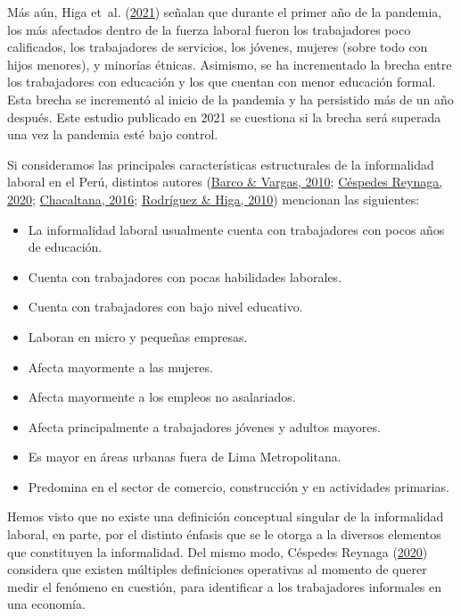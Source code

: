 \documentclass[
  letterpaper,
  12pt,
  oneside,
  spanish,
  doublespacing,
  headsepline,
  parskip]{MastersDoctoralThesis}
\begin{document}
Más aún, Higa et~al. (\protect\hyperlink{ref-higa2021}{2021}) señalan
que durante el primer año de la pandemia, los más afectados dentro de la
fuerza laboral fueron los trabajadores poco calificados, los
trabajadores de servicios, los jóvenes, mujeres (sobre todo con hijos
menores), y minorías étnicas. Asimismo, se ha incrementado la brecha
entre los trabajadores con educación y los que cuentan con menor
educación formal. Esta brecha se incrementó al inicio de la pandemia y
ha persistido más de un año después. Este estudio publicado en 2021 se
cuestiona si la brecha será superada una vez la pandemia esté bajo
control.

Si consideramos las principales características estructurales de la
informalidad laboral en el Perú, distintos autores
(\protect\hyperlink{ref-barco2010}{Barco \& Vargas, 2010};
\protect\hyperlink{ref-cuxe9spedesreynaga2020}{Céspedes Reynaga, 2020};
\protect\hyperlink{ref-chacaltana2016}{Chacaltana, 2016};
\protect\hyperlink{ref-rodruxedguez2010}{Rodríguez \& Higa, 2010})
mencionan las siguientes:

\begin{itemize}
\item
  La informalidad laboral usualmente cuenta con trabajadores con pocos
  años de educación.
\item
  Cuenta con trabajadores con pocas habilidades laborales.
\item
  Cuenta con trabajadores con bajo nivel educativo.
\item
  Laboran en micro y pequeñas empresas.
\item
  Afecta mayormente a las mujeres.
\item
  Afecta mayormente a los empleos no asalariados.
\item
  Afecta principalmente a trabajadores jóvenes y adultos mayores.
\item
  Es mayor en áreas urbanas fuera de Lima Metropolitana.
\item
  Predomina en el sector de comercio, construcción y en actividades
  primarias.
\end{itemize}

Hemos visto que no existe una definición conceptual singular de la
informalidad laboral, en parte, por el distinto énfasis que se le otorga
a la diversos elementos que constituyen la informalidad. Del mismo modo,
Céspedes Reynaga (\protect\hyperlink{ref-cuxe9spedesreynaga2020}{2020})
considera que existen múltiples definiciones operativas al momento de
querer medir el fenómeno en cuestión, para identificar a los
trabajadores informales en una economía.
\end{document}
